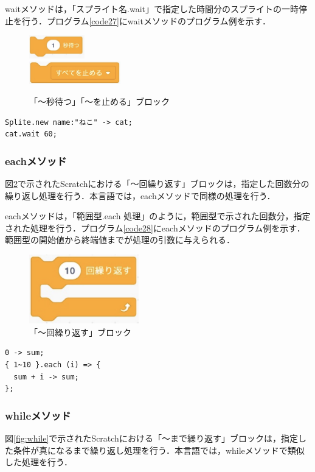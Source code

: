 \documentclass[10pt,a4j]{ltjsarticle}
\begin{document}
waitメソッドは，「スプライト名.wait」で指定した時間分のスプライトの一時停止を行う．プログラム\ref{code27}にwaitメソッドのプログラム例を示す．

\begin{figure}[H]
  \centering
  \includegraphics[height=10mm]{images/wait.pdf} \\
  \includegraphics[height=10mm]{images/stop.pdf} 
  \caption{「〜秒待つ」「〜を止める」ブロック}
  \label{fig:wait}
\end{figure}

\begin{lstlisting}[caption=waitメソッドのプログラム例, label=code27]
Splite.new name:"ねこ" -> cat;
cat.wait 60;
\end{lstlisting}

\subsubsection{eachメソッド}
図\ref{fig:each}で示されたScratchにおける「〜回繰り返す」ブロックは，指定した回数分の繰り返し処理を行う．本言語では，eachメソッドで同様の処理を行う．

eachメソッドは，「範囲型.each 処理」のように，範囲型で示された回数分，指定された処理を行う．プログラム\ref{code28}にeachメソッドのプログラム例を示す．範囲型の開始値から終端値までが処理の引数に与えられる．

\begin{figure}[H]
  \centering
  \includegraphics[height=30mm]{images/each.pdf} 
  \caption{「〜回繰り返す」ブロック}
  \label{fig:each}
\end{figure}

\begin{lstlisting}[caption=eachメソッドのプログラム例, label=code28]
0 -> sum;
{ 1~10 }.each (i) => {
  sum + i -> sum;
};
\end{lstlisting}
\subsubsection{whileメソッド}
図\ref{fig:while}で示されたScratchにおける「〜まで繰り返す」ブロックは，指定した条件が真になるまで繰り返し処理を行う．本言語では，whileメソッドで類似した処理を行う．
\end{document}
